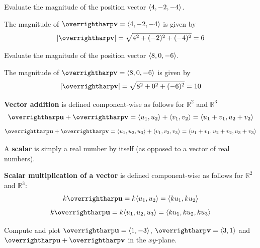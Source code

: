 \documentclass[letterpaper, twoside, 12pt]{book}
\begin{document}
          \begin{problem}
            Evaluate the magnitude of the position vector $\langle4,-2,-4\rangle$.
          \end{problem}

          \begin{solution}
  The magnitude of $\vect{v}=\<4,-2,-4\>$ is given by
  \[|\vect{v}|=\sqrt{4^2+(-2)^2+(-4)^2}=6\]
          \end{solution}

          \begin{problem}
            Evaluate the magnitude of the position vector $\langle8,0,-6\rangle$.
          \end{problem}

          \begin{solution}
  The magnitude of $\vect{v}=\<8,0,-6\>$ is given by
  \[|\vect{v}|=\sqrt{8^2+0^2+(-6)^2}=10\]
          \end{solution}



\begin{definition}
  \textbf{Vector addition} is defined component-wise as follows for
  $\mathbb{R}^2$ and $\mathbb{R}^3$
  \[
    \harpvec{u}+\harpvec{v}
      =
    \<u_1,u_2\>+\<v_1,v_2\>
      =
    \<u_1+v_1,u_2+v_2\>
  \]
  \[
    \harpvec{u}+\harpvec{v}
      =
    \<u_1,u_2,u_3\>+\<v_1,v_2,v_3\>
      =
    \<u_1+v_1,u_2+v_2,u_3+v_3\>
  \]
\end{definition}

\begin{definition}
  A \textbf{scalar} is simply a real number by itself
  (as opposed to a vector of real numbers).
\end{definition}

\begin{definition}
  \textbf{Scalar multiplication of a vector} is defined component-wise as
  follows for $\mathbb{R}^2$ and $\mathbb{R}^3$:
  \[
    k\harpvec{u}
      =
    k\<u_1,u_2\>
      =
    \<ku_1,ku_2\>
  \]
  \[
    k\harpvec{u}
      =
    k\<u_1,u_2,u_3\>
      =
    \<ku_1,ku_2,ku_3\>
  \]
\end{definition}



          \begin{problem}
            Compute and plot $\harpvec{u}=\<1,-3\>$, $\harpvec{v}=\<3,1\>$
            and $\harpvec{u}+\harpvec{v}$ in the $xy$-plane.
          \end{problem}
\end{document}
